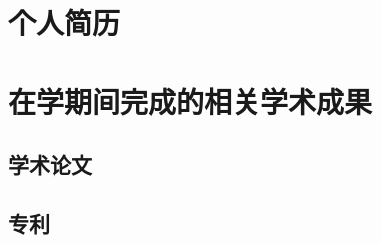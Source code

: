
\begin{resume}

  \section*{个人简历}


  \section*{在学期间完成的相关学术成果}

  \subsection*{学术论文}

  \begin{achievements}
  \end{achievements}


  \subsection*{专利}

  \begin{achievements}
  \end{achievements}

\end{resume}

